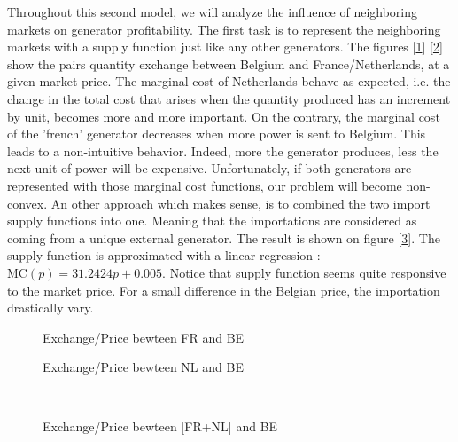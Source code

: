 
Throughout this second model, we will analyze the influence of neighboring markets on generator profitability. The first task is to represent the neighboring markets with a supply function just like any other generators. The figures [\ref{fig:France}] [\ref{fig:Netherlands}] show the pairs quantity exchange between Belgium and France/Netherlands, at a given market price. The marginal cost of Netherlands behave as expected, i.e. the change in the total cost that arises when the quantity produced has an increment by unit, becomes more and more important. On the contrary, the marginal cost of the 'french' generator decreases when more power is sent to Belgium. This leads to a non-intuitive behavior. Indeed, more the generator produces, less the next unit of power will be expensive. Unfortunately, if both generators are represented with those marginal cost functions, our problem will become non-convex. An other approach which makes sense, is to combined the two import supply functions into one. Meaning that the importations are considered as coming from a unique external generator. The result is shown on figure [\ref{France_Netherlands}]. The supply function is approximated with a linear regression : $\text{MC}(p)= 31.2424 p + 0.005$. Notice that supply function seems quite responsive to the market price. For a small difference in the Belgian price, the importation drastically vary. \\

\vspace{0.5cm}

\begin{minipage}{0.495\textwidth} 
\begin{figure}[H]
    \centering
    \newlength\fheight 
    \newlength\fwidth 
    \setlength\fheight{4cm}
    \setlength{}
    
    \caption{Exchange/Price bewteen FR and BE}
    \label{fig:France}
\end{figure}
\end{minipage}
\begin{minipage}{0.495\textwidth} 
\begin{figure}[H]
    \centering
    \setlength\fheight{4cm}
    \setlength{}
    
    \caption{Exchange/Price bewteen NL and BE}
    \label{fig:Netherlands}
\end{figure}
\end{minipage} \\
\begin{figure}[H]
    \centering
    \setlength\fheight{4cm}
    \setlength{}
    
    \caption{Exchange/Price bewteen [FR+NL] and BE}
    \label{France_Netherlands}
\end{figure}

